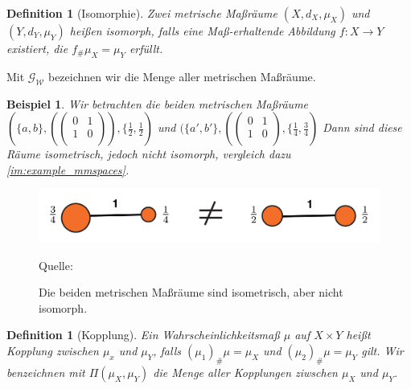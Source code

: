 \documentclass[11pt,a4paper]{article}
\newcommand{\source}[1]{\caption*{\hfill Quelle: {#1}} }
\newtheorem{definition}[theorem]{Definition}
\newtheorem{example}[theorem]{Beispiel}
\numberwithin{equation}{section}
\begin{document}

	\begin{definition}[Isomorphie]
		Zwei metrische Maßräume $(X,d_X,\mu_X)$ und $(Y,d_Y,\mu_Y)$ heißen isomorph, falls eine Maß-erhaltende Abbildung $f:X \to Y$ existiert, die $f_\#\mu_X = \mu_Y$ erfüllt.
	\end{definition}
	
	Mit $\mathcal{G}_\mathcal{W}$ bezeichnen wir die Menge aller metrischen Maßräume.
	
	\begin{example}
		Wir betrachten die beiden metrischen Maßräume $(\lbrace a,b \rbrace, (\begin{pmatrix}
		0 & 1\\
		1 & 0 \\
		\end{pmatrix}), \lbrace \frac{1}{2},\frac{1}{2})$ und 
		$(\lbrace a',b' \rbrace, (
		\begin{pmatrix}
		0 & 1\\
		1 & 0 \\
		\end{pmatrix}, \lbrace \frac{1}{4},\frac{3}{4})$
		Dann sind diese Räume isometrisch, jedoch nicht isomorph, vergleich dazu \autoref{im:example_mmspaces}.
	\end{example}
	
	\begin{figure}[ht]
		\centering
		\includegraphics[width=0.3\textheight]{example_mmspaces.png}
		\caption[Beispiel isometrischer metrischer Maßräume]{Die beiden metrischen Maßräume sind isometrisch, aber nicht isomorph.}
		\source{\cite{COTcuturi}}
		\label{im:example_mmspaces}
	\end{figure}
	
	
	\begin{definition}[Kopplung]
		Ein Wahrscheinlichkeitsmaß $\mu$ auf $X \times Y$ heißt Kopplung zwischen $\mu_x$ und $\mu_Y$, falls $(\mu_1)_\#\mu = \mu_X$ und $(\mu_2)_\#\mu = \mu_Y$ gilt. Wir benzeichnen mit $\Pi(\mu_X,\mu_Y)$ die Menge aller Kopplungen ziwschen $\mu_X$ und $\mu_Y$.
	\end{definition}
	
\end{document}
